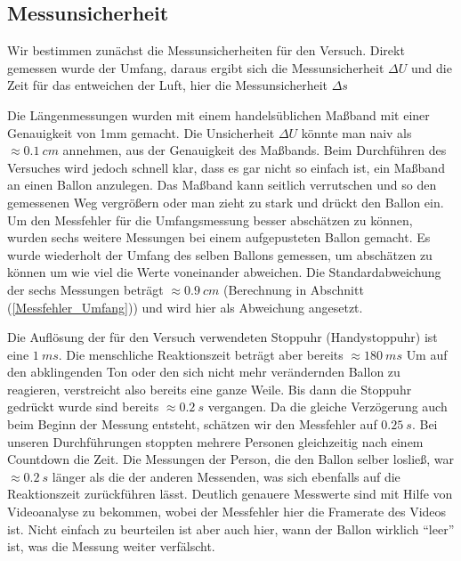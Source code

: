 \documentclass{article}
\begin{document}

        \subsection{Messunsicherheit}
            Wir bestimmen zunächst die Messunsicherheiten für den Versuch.
            Direkt gemessen wurde der Umfang, daraus ergibt sich die Messunsicherheit \(\Delta U\)
            und die Zeit für das entweichen der Luft, hier die Messunsicherheit \(\Delta s\)

            Die Längenmessungen wurden mit einem handelsüblichen Maßband mit einer Genauigkeit von 1mm gemacht.
            Die Unsicherheit \( \Delta U \) könnte man naiv als \( \approx \SI{0.1}{cm} \) annehmen, aus der Genauigkeit des Maßbands.
            Beim Durchführen des Versuches wird jedoch schnell klar, dass es gar nicht so einfach ist, ein Maßband an einen Ballon anzulegen.
            Das Maßband kann seitlich verrutschen und so den gemessenen Weg vergrößern oder man zieht zu stark und drückt den Ballon ein.
            Um den Messfehler für die Umfangsmessung besser abschätzen zu können, wurden
            sechs weitere Messungen bei einem aufgepusteten Ballon gemacht.
            Es wurde wiederholt der Umfang des selben Ballons gemessen, um abschätzen zu können um wie viel die Werte voneinander abweichen.
            Die Standardabweichung der sechs Messungen beträgt \( \approx \SI{0.9}{cm}\) (Berechnung in Abschnitt (\ref{Messfehler_Umfang})) und wird hier als Abweichung angesetzt.
            
            Die Auflösung der für den Versuch verwendeten Stoppuhr (Handystoppuhr) ist eine \(\SI{1}{ms}\).
            Die menschliche Reaktionszeit beträgt aber bereits \(\approx \SI{180}{ms} \) \cite{Reaktionszeit}
            Um auf den abklingenden Ton oder den sich nicht mehr verändernden Ballon zu reagieren, verstreicht also bereits eine ganze Weile.
            Bis dann die Stoppuhr gedrückt wurde sind bereits \(\approx \SI{0.2}{s}\) vergangen.
            Da die gleiche Verzögerung auch beim Beginn der Messung entsteht, schätzen wir den Messfehler auf \(\SI{0.25}{s}\).
            Bei unseren Durchführungen stoppten mehrere Personen gleichzeitig nach einem Countdown die Zeit. Die Messungen der
            Person, die den Ballon selber losließ, war \(\approx \SI{0.2}{s} \) länger als die der anderen Messenden, 
            was sich ebenfalls auf die Reaktionszeit zurückführen lässt.
            Deutlich genauere Messwerte sind mit Hilfe von Videoanalyse zu bekommen, wobei der Messfehler hier die Framerate des Videos ist.
            Nicht einfach zu beurteilen ist aber auch hier, wann der Ballon wirklich \enquote{leer} ist, was die Messung weiter verfälscht.
\end{document}
